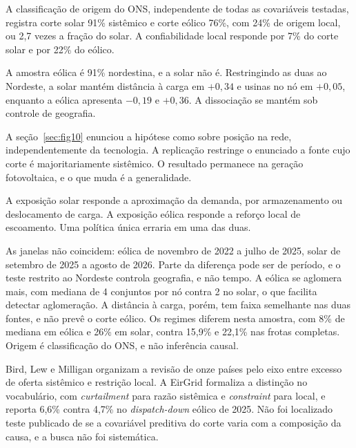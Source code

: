 A classificação de origem do ONS, independente de todas as covariáveis testadas,
registra corte solar 91\% sistêmico e corte eólico 76\%, com 24\% de origem
local, ou 2,7 vezes a fração do solar. A confiabilidade local responde por 7\%
do corte solar e por 22\% do eólico.


 A amostra eólica é 91\% nordestina, e a solar não é.
Restringindo as duas ao Nordeste, a solar mantém distância à carga em $+0{,}34$
e usinas no nó em $+0{,}05$, enquanto a eólica apresenta $-0{,}19$ e $+0{,}36$.
A dissociação se mantém sob controle de geografia.

 A seção~\ref{sec:fig10} enunciou a hipótese
como sobre posição na rede, independentemente da tecnologia. A replicação
restringe o enunciado a fonte cujo corte é majoritariamente sistêmico. O
resultado permanece na geração fotovoltaica, e o que muda é a generalidade.

 A exposição solar responde a aproximação da
demanda, por armazenamento ou deslocamento de carga. A exposição eólica responde
a reforço local de escoamento. Uma política única erraria em uma das duas.

\begin{objecao}
As janelas não coincidem: eólica de novembro de 2022 a julho de 2025, solar de
setembro de 2025 a agosto de 2026. Parte da diferença pode ser de período, e o
teste restrito ao Nordeste controla geografia, e não tempo. A eólica se aglomera
mais, com mediana de 4 conjuntos por nó contra 2 no solar, o que facilita
detectar aglomeração. A distância à carga, porém, tem faixa semelhante nas duas
fontes, e não prevê o corte eólico. Os regimes diferem nesta amostra, com 8\% de mediana
em eólica e 26\% em solar, contra 15,9\% e 22,1\% nas frotas completas. Origem é
classificação do ONS, e não inferência causal.
\end{objecao}

 Bird, Lew e Milligan \cite{bird2016} organizam a
revisão de onze países pelo eixo entre excesso de oferta sistêmico e restrição
local. A EirGrid \cite{eirgrid} formaliza a distinção no vocabulário, com
\textit{curtailment} para razão sistêmica e \textit{constraint} para local, e
reporta 6,6\% contra 4,7\% no \textit{dispatch-down} eólico de 2025. Não foi
localizado teste publicado de se a covariável preditiva do corte varia com a
composição da causa, e a busca não foi sistemática.

